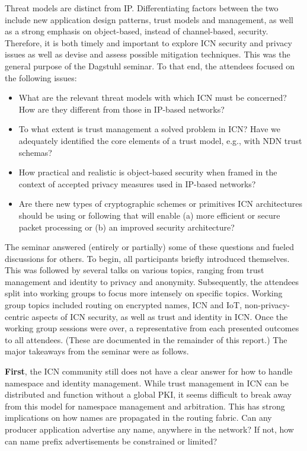 \documentclass{sig-alternate-10pt}
\begin{document}
Threat models are distinct from IP. Differentiating factors between the two include
new application design patterns, trust models and management, as well as a strong
emphasis on object-based, instead of channel-based, security. Therefore, it is both
timely and important to explore ICN security and privacy issues as well as devise and
assess possible mitigation techniques. This was the general purpose of the Dagstuhl
seminar. To that end, the attendees focused on the following issues:
%
\begin{itemize}
\item What are the relevant threat models with which ICN must be concerned? How are
they different from those in IP-based networks?
\item To what extent is trust management a solved problem in ICN? Have we adequately
identified the core elements of a trust model, e.g., with NDN trust schemas?
\item How practical and realistic is object-based security when framed in the
context of accepted privacy measures used in IP-based networks?
\item Are there new types of cryptographic schemes or primitives ICN architectures
should be using or following that will enable (a) more efficient or secure packet
processing or (b) an improved security architecture?
\end{itemize}
%
The seminar answered (entirely or partially) some of these questions and fueled discussions
for others. To begin, all participants briefly introduced themselves. This was followed
by several talks on various topics, ranging from trust management and identity to privacy
and anonymity. Subsequently, the attendees split into working groups to focus more
intensely on specific topics. Working group topics included routing on encrypted names,
ICN and IoT, non-privacy-centric aspects of ICN security, as well as trust and identity in ICN.
Once the working group sessions were over, a representative from each presented outcomes
to all attendees. (These are documented in the remainder of this report.) The major
takeaways from the seminar were as follows.

{\bf First}, the ICN community still does not have a clear answer for how to handle
namespace and identity management. While trust management in ICN can be distributed and
function without a global PKI, it seems difficult to break away from this model for
namespace management and arbitration. This has strong implications on how names are
propagated in the routing fabric. Can any producer application advertise any name,
anywhere in the network? If not, how can name prefix advertisements be constrained or limited?
\end{document}
